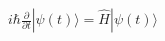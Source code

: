 \documentclass[preview]{standalone}
\begin{document}
\begin{align*}
i\hbar \frac{\partial}{\partial t}|\psi(t)\rangle = \hat{H}|\psi(t)\rangle
\end{align*}
\end{document}
